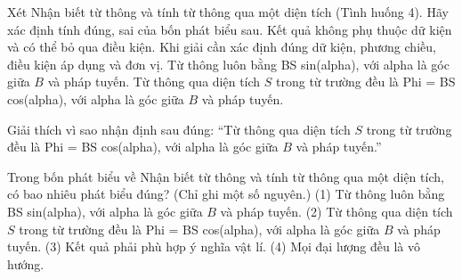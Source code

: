 \begin{ex}
Xét Nhận biết từ thông và tính từ thông qua một diện tích (Tình huống 4). Hãy xác định tính đúng, sai của bốn phát biểu sau.
\choiceTF
{Kết quả không phụ thuộc dữ kiện và có thể bỏ qua điều kiện.}
{\True Khi giải cần xác định đúng dữ kiện, phương chiều, điều kiện áp dụng và đơn vị.}
{Từ thông luôn bằng BS sin(alpha), với alpha là góc giữa $B$ và pháp tuyến.}
{\True Từ thông qua diện tích $S$ trong từ trường đều là Phi = BS cos(alpha), với alpha là góc giữa $B$ và pháp tuyến.}
\end{ex}

\begin{bt}
Giải thích vì sao nhận định sau đúng: “Từ thông qua diện tích $S$ trong từ trường đều là Phi = BS cos(alpha), với alpha là góc giữa $B$ và pháp tuyến.”
\end{bt}

\begin{ex}
Trong bốn phát biểu về Nhận biết từ thông và tính từ thông qua một diện tích, có bao nhiêu phát biểu đúng? (Chỉ ghi một số nguyên.) (1) Từ thông luôn bằng BS sin(alpha), với alpha là góc giữa $B$ và pháp tuyến. (2) Từ thông qua diện tích $S$ trong từ trường đều là Phi = BS cos(alpha), với alpha là góc giữa $B$ và pháp tuyến. (3) Kết quả phải phù hợp ý nghĩa vật lí. (4) Mọi đại lượng đều là vô hướng.
\end{ex}

